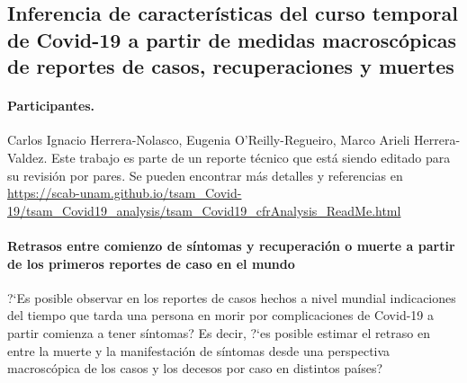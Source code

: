 \subsection*{Inferencia de características del curso temporal de Covid-19 a partir de medidas macroscópicas de reportes de casos, recuperaciones y muertes}

\paragraph{Participantes.} Carlos Ignacio Herrera-Nolasco, Eugenia O'Reilly-Regueiro, Marco Arieli Herrera-Valdez. Este trabajo es parte de un reporte técnico que está siendo editado para su revisión por pares. Se pueden encontrar más detalles y referencias en \url{https://scab-unam.github.io/tsam_Covid-19/tsam_Covid19_analysis/tsam_Covid19_cfrAnalysis_ReadMe.html}
\paragraph{Retrasos entre comienzo de síntomas y recuperación o muerte a partir de los primeros reportes de caso en el mundo}


?`Es posible observar en los reportes de casos hechos a nivel mundial indicaciones del tiempo que tarda una persona en morir por complicaciones de Covid-19 a partir comienza a tener síntomas? Es decir, ?`es posible estimar el retraso en entre la muerte y la manifestación de síntomas desde una perspectiva macroscópica de los casos y los decesos por caso en distintos países?


